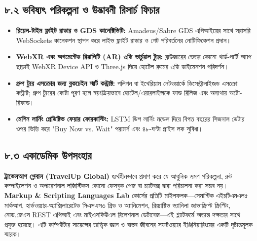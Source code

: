 \documentclass[11pt,a4paper]{article}
\begin{document}
\subsection{৮.২ ভবিষ্যৎ পরিকল্পনা ও উদ্ভাবনী রিসার্চ ফিচার}
\begin{itemize}[leftmargin=*]
    \item \textbf{রিয়েল-টাইম ফ্লাইট রাডার ও GDS কানেক্টিভিটি:} Amadeus/Sabre GDS এপিআইয়ের সাথে সরাসরি WebSockets কানেকশন স্থাপন করে লাইভ ফ্লাইট রাডার ও গেট পরিবর্তনের নোটিফিকেশন প্রদান।
    \item \textbf{WebXR এবং অগমেন্টেড রিয়ালিটি (AR) ৩ডি ভার্চুয়াল ট্যুর:} ব্রাউজারের ভেতর কোনো থার্ড-পার্টি অ্যাপ ছাড়াই WebXR Device API ও Three.js দিয়ে হোটেল রুমের ৩ডি ডাইমেনশন পরিদর্শন।
    \item \textbf{গ্রুপ ট্যুর এসক্রোর জন্য ব্লকচেইন স্মার্ট কন্ট্রাক্ট:} পলিগন বা ইথেরিয়াম নেটওয়ার্কে ডিসেন্ট্রালাইজড এসক্রো কন্ট্রাক্ট; গ্রুপ ট্যুরের কোটা পূরণ হলে স্বয়ংক্রিয়ভাবে হোটেল/এয়ারলাইন্সকে ফান্ড রিলিজ এবং অন্যথায় অটো-রিফান্ড।
    \item \textbf{মেশিন লার্নিং প্রেডিক্টিভ ফেয়ার ফোরকাস্টিং:} LSTM ডিপ লার্নিং মডেল দিয়ে বিগত বছরের সিজনাল ডেটার ওপর ভিত্তি করে "Buy Now vs. Wait" পরামর্শ এবং ৪৮-ঘণ্টা প্রাইস লক সুবিধা।
\end{itemize}

\subsection{৮.৩ একাডেমিক উপসংহার}
\textbf{ট্রাভেলআপ গ্লোবাল (TravelUp Global)} দ্ব্যর্থহীনভাবে প্রমাণ করে যে আধুনিক ভ্রমণ পরিকল্পনা, রুট কম্পাইলেশন ও অপারেশনাল লজিস্টিকস কোনো ফেসবুক পেজ বা চ্যাটবক্স দ্বারা পরিচালনা করা সম্ভব নয়। \textbf{Markup \& Scripting Languages Lab} কোর্সের প্রতিটি মাইলফলক—সেমান্টিক এইচটিএমএল৫ মার্কআপ, হার্ডওয়্যার-অ্যাক্সিলারেটেড সিএসএস৩ গ্রিড ও অ্যানিমেশন, রিয়্যাক্টিভ ভ্যানিলা জাভাস্ক্রিপ্ট স্ক্রিপ্টিং, নোড.জেএস REST এপিআই এবং মাইএসকিউএল রিলেশনাল ডেটাবেজ—এই প্ল্যাটফর্মে অত্যন্ত দক্ষতার সাথে প্রযুক্ত হয়েছে। এটি কম্পিউটার সায়েন্সের তাত্ত্বিক জ্ঞান ও বাস্তব জীবনের সফটওয়্যার ইঞ্জিনিয়ারিংয়ের একটি দৃষ্টান্তমূলক স্মারক।
\end{document}
